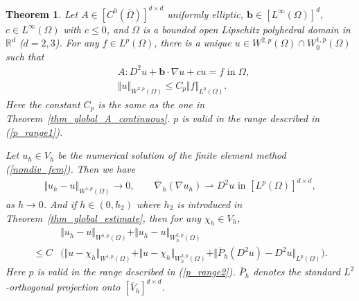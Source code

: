 \documentclass[10pt,a4paper]{amsart}
\newtheorem{theorem}{Theorem}
\begin{document}
\begin{theorem}
\label{thm_A_continuous_complete}
Let $A \in [C^{0}(\overline{\Omega})]^{d\times d}$ uniformly elliptic, 
$\boldsymbol{b}\in [L^{\infty}(\Omega)]^{d}$, $c \in L^{\infty}(\Omega)$ with $c \leq 0$, 
 and $\Omega$ is a bounded open Lipschitz polyhedral domain in $\mathbb{R}^{d}$ ($d=2,3$).  
For any $f \in L^{p}(\Omega)$, 
there is a unique $u \in W^{2,p}(\Omega) \cap W_{0}^{1,p}(\Omega)$ such that 
\begin{subequations}
\label{A_continuous_wellposedness_props}
\begin{align}
\label{A_continuous_wellposedness_prop1}
& A:D^{2} u + \boldsymbol{b}\cdot \nabla u + cu = f \text{ in } \Omega, \\
\label{A_continuous_wellposedness_prop2}
& \Vert u\Vert_{W^{2,p}(\Omega)} \leq C_{p} \Vert f \Vert_{L^{p}(\Omega)}.
\end{align}
\end{subequations}
Here the constant $C_{p}$ is the same as the one in Theorem~\ref{thm_global_A_continuous}. 
$p$ is valid in the range described in (\ref{p_range1}).

Let $u_{h} \in V_{h}$ be the numerical solution of the finite element method 
(\ref{nondiv_fem}). Then we have 
\begin{align}
\label{A_continuous_conv}
\Vert u_{h} -  u \Vert_{W^{1,p}(\Omega)} \rightarrow 0, \qquad 
\overline{\nabla}_{h}(\nabla u_{h}) \rightharpoonup D^{2}u \text{ in } 
[L^{p}(\Omega)]^{d \times d},
\end{align}
as $h \rightarrow 0$. 
And if $h \in (0,h_{2})$ where $h_{2}$ is introduced in Theorem~\ref{thm_global_estimate}, then for any 
$\chi_{h} \in V_{h}$,
\begin{align}
\label{A_continuous_conv_rate}
& \Vert u_{h} - u \Vert_{W^{1,p}(\Omega)}
+ \Vert u_{h} - u \Vert_{W_{h}^{2,p}(\Omega)} \\
\nonumber
\leq C & \big( \Vert u  - \chi_{h} \Vert_{W^{1,p}(\Omega)} + \Vert u - \chi_{h}\Vert_{W_{h}^{2,p}(\Omega)} 
+ \Vert \overline{P}_{h}(D^{2}u) - D^{2}u \Vert_{L^{p}(\Omega)} \big).
\end{align}
Here $p$ is valid in the range described in (\ref{p_range2}). 
$\overline{P}_{h}$ denotes the standard $L^{2}$-orthogonal projection onto $[\overline{V}_{h}]^{d\times d}$.
\end{theorem}
\end{document}
